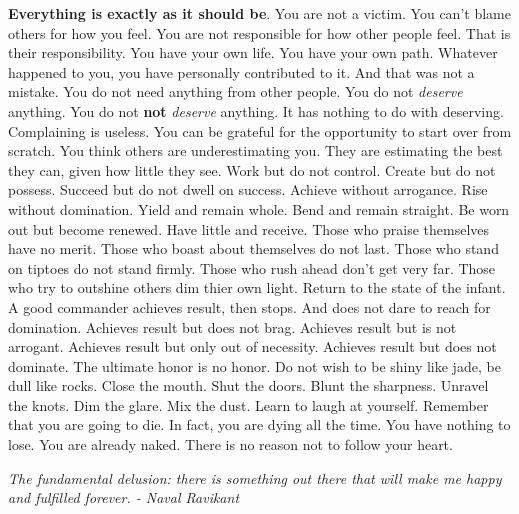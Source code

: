 \documentclass[a4paper,hidelinks]{article}
\begin{document}
\textbf{Everything is exactly as it should be}.
You are not a victim.
You can't blame others for how you feel.
You are not responsible for how other people feel.
That is their responsibility.
You have your own life.
You have your own path.
Whatever happened to you, you have personally contributed to it.
And that was not a mistake.
You do not need anything from other people.
You do not \textit{deserve} anything.
You do not \textbf{not} \textit{deserve} anything.
It has nothing to do with deserving.
Complaining is useless.
You can be grateful for the opportunity to start over from scratch.
You think others are underestimating you.
They are estimating the best they can, given how little they see.
Work but do not control.
Create but do not possess.
Succeed but do not dwell on success.
Achieve without arrogance.
Rise without domination.
Yield and remain whole.
Bend and remain straight.
Be worn out but become renewed.
Have little and receive.
Those who praise themselves have no merit.
Those who boast about themselves do not last.
Those who stand on tiptoes do not stand firmly.
Those who rush ahead don't get very far.
Those who try to outshine others dim thier own light.
Return to the state of the infant.
A good commander achieves result, then stops.
And does not dare to reach for domination.
Achieves result but does not brag.
Achieves result but is not arrogant.
Achieves result but only out of necessity.
Achieves result but does not dominate.
The ultimate honor is no honor.
Do not wish to be shiny like jade, be dull like rocks.
Close the mouth.
Shut the doors.
Blunt the sharpness.
Unravel the knots.
Dim the glare.
Mix the dust.
Learn to laugh at yourself.
Remember that you are going to die.
In fact, you are dying all the time.
You have nothing to lose.
You are already naked.
There is no reason not to follow your heart.


\newpage

\begin{center}
\textit{
The fundamental delusion: there is something out there that will make me happy and fulfilled forever. - Naval Ravikant
}
\end{center}
\end{document}
